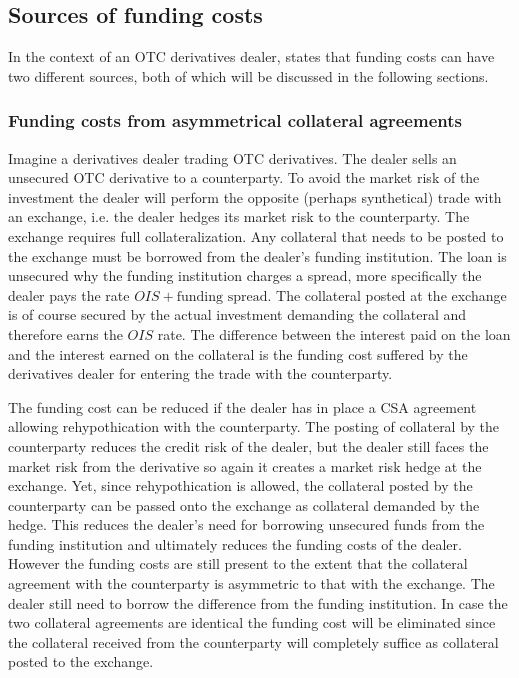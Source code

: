 \documentclass[../main.tex]{subfiles}
\begin{document}
    \subsection{Sources of funding costs}
    In the context of an OTC derivatives dealer, \cite{Ruiz2013FVA} states that funding costs can have two different sources, both of which will be discussed in the following sections. 

    \subsubsection{Funding costs from asymmetrical collateral agreements}
        Imagine a derivatives dealer trading OTC derivatives. The dealer sells an unsecured OTC derivative to a counterparty. To avoid the market risk of the investment the dealer will perform the opposite (perhaps synthetical) trade with an exchange, i.e. the dealer hedges its market risk to the counterparty. The exchange requires full collateralization. Any collateral that needs to be posted to the exchange must be borrowed from the dealer's funding institution. The loan is unsecured why the funding institution charges a spread, more specifically the dealer pays the rate $OIS + \text{funding spread}$. The collateral posted at the exchange is of course secured by the actual investment demanding the collateral and therefore earns the $OIS$ rate. The difference between the interest paid on the loan and the interest earned on the collateral is the funding cost suffered by the derivatives dealer for entering the trade with the counterparty. 

        The funding cost can be reduced if the dealer has in place a CSA agreement allowing rehypothication with the counterparty. The posting of collateral by the counterparty reduces the credit risk of the dealer, but the dealer still faces the market risk from the derivative so again it creates a market risk hedge at the exchange. Yet, since rehypothication is allowed, the collateral posted by the counterparty can be passed onto the exchange as collateral demanded by the hedge. This reduces the dealer's need for borrowing unsecured funds from the funding institution and ultimately reduces the funding costs of the dealer. However the funding costs are still present to the extent that the collateral agreement with the counterparty is asymmetric to that with the exchange. The dealer still need to borrow the difference from the funding institution. In case the two collateral agreements are identical the funding cost will be eliminated since the collateral received from the counterparty will completely suffice as collateral posted to the exchange.
\end{document}
